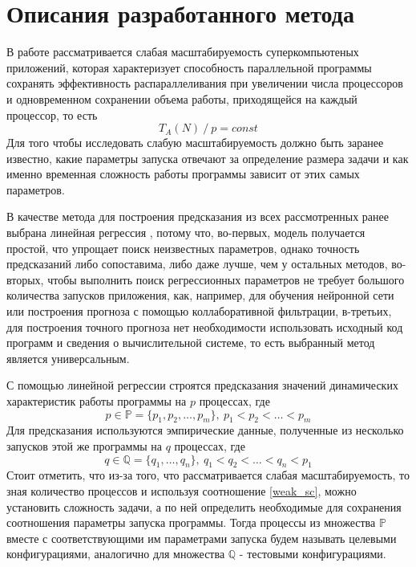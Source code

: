 
\chapter{Описания разработанного метода}
	В работе рассматривается слабая масштабируемость суперкомпьютеных приложений, которая характеризует способность параллельной программы сохранять эффективность распараллеливания при увеличении числа процессоров и одновременном сохранении объема работы, приходящейся на каждый процессор, то есть
	\begin{equation}\label{weak_sc}
	T_A(N)\:/\:p = const
	\end{equation}
	Для того чтобы исследовать слабую масштабируемость должно быть заранее известно, какие параметры запуска отвечают за определение размера задачи и как именно временная сложность работы программы зависит от этих самых параметров.

	В качестве метода для построения предсказания из всех рассмотренных ранее выбрана линейная регрессия%
	, потому что, во-первых, модель получается простой, что упрощает поиск неизвестных параметров, однако точность предсказаний либо сопоставима, либо даже лучше, чем у остальных методов, во-вторых, чтобы выполнить поиск регрессионных параметров не требует большого количества запусков приложения, как, например, для обучения нейронной сети или построения прогноза с помощью коллаборативной фильтрации, в-третьих, для построения точного прогноза нет необходимости использовать исходный код программ и сведения о вычислительной системе, то есть выбранный метод является универсальным.%

	С помощью линейной регрессии строятся предсказания значений динамических характеристик работы программы на \(p\) процессах, где \[p \in \mathbb{P} = \{p_1, p_2, \ldots, p_m \},\ p_1 < p_2 < \ldots < p_m\] Для предсказания используются эмпирические данные, полученные из несколько запусков этой же программы на \(q\) процессах, где \[q \in \mathbb{Q} = \{q_1,\ldots, q_n\},\ q_1 < q_2 < \ldots < q_n < p_1\] Стоит отметить, что из-за того, что рассматривается слабая масштабируемость, то зная количество процессов и используя соотношение \eqref{weak_sc}, можно установить сложность задачи, а по ней определить необходимые для сохранения соотношения параметры запуска программы. Тогда процессы из множества \(\mathbb{P}\) вместе с соответствующими им параметрами запуска будем называть целевыми конфигурациями, аналогично для множества \(\mathbb{Q}\) - тестовыми конфигурациями.

